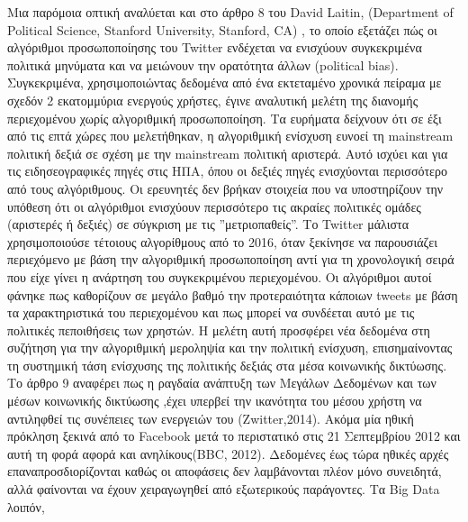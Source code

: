 \documentclass{report}
\begin{document}
Μια παρόμοια οπτική αναλύεται και στο άρθρο 8 του  David Laitin, (Department of Political Science, Stanford University, Stanford, CA) , το οποίο εξετάζει πώς οι αλγόριθμοι προσωποποίησης του  Twitter  ενδέχεται να ενισχύουν συγκεκριμένα πολιτικά μηνύματα και να μειώνουν την ορατότητα άλλων (political bias). Συγκεκριμένα, χρησιμοποιώντας δεδομένα από ένα εκτεταμένο χρονικά πείραμα με σχεδόν 2 εκατομμύρια ενεργούς χρήστες, έγινε αναλυτική μελέτη της διανομής περιεχομένου χωρίς αλγοριθμική προσωποποίηση. Τα ευρήματα δείχνουν ότι σε έξι από τις επτά χώρες που μελετήθηκαν, η αλγοριθμική ενίσχυση ευνοεί τη  mainstream  πολιτική δεξιά σε σχέση με την  mainstream  πολιτική αριστερά. Αυτό ισχύει και για τις ειδησεογραφικές πηγές στις ΗΠΑ, όπου οι δεξιές πηγές ενισχύονται περισσότερο από τους αλγόριθμους. Οι ερευνητές δεν βρήκαν στοιχεία που να υποστηρίζουν την υπόθεση ότι οι αλγόριθμοι ενισχύουν περισσότερο τις ακραίες πολιτικές ομάδες (αριστερές ή δεξιές) σε σύγκριση με τις ''μετριοπαθείς''.
Το  Twitter  μάλιστα χρησιμοποιούσε τέτοιους αλγορίθμους από το 2016, όταν ξεκίνησε να παρουσιάζει περιεχόμενο με βάση την αλγοριθμική προσωποποίηση αντί για τη χρονολογική σειρά που είχε γίνει η ανάρτηση του συγκεκριμένου περιεχομένου. Οι αλγόριθμοι αυτοί φάνηκε πως καθορίζουν σε μεγάλο βαθμό την προτεραιότητα κάποιων tweets  με βάση τα χαρακτηριστικά του περιεχομένου και πως μπορεί να συνδέεται αυτό με τις πολιτικές πεποιθήσεις των χρηστών. Η μελέτη αυτή  προσφέρει νέα δεδομένα στη συζήτηση για την αλγοριθμική μεροληψία και την πολιτική ενίσχυση, επισημαίνοντας τη συστημική τάση ενίσχυσης της πολιτικής δεξιάς στα μέσα κοινωνικής δικτύωσης.
\newline Το άρθρο 9 αναφέρει πως η ραγδαία ανάπτυξη των Μεγάλων Δεδομένων και των μέσων κοινωνικής δικτύωσης ,έχει υπερβεί
την ικανότητα του μέσου χρήστη να αντιληφθεί τις συνέπειες των ενεργειών του (Zwitter,2014). Ακόμα μία ηθική πρόκληση ξεκινά από το Facebook μετά το περιστατικό στις 21 Σεπτεμβρίου 2012 και αυτή τη φορά αφορά και ανηλίκους(BBC, 2012).  Δεδομένες έως τώρα ηθικές αρχές επαναπροσδιορίζονται καθώς οι αποφάσεις δεν λαμβάνονται πλέον μόνο συνειδητά, αλλά φαίνονται να έχουν χειραγωγηθεί από εξωτερικούς παράγοντες. Τα Big Data λοιπόν,
\end{document}
